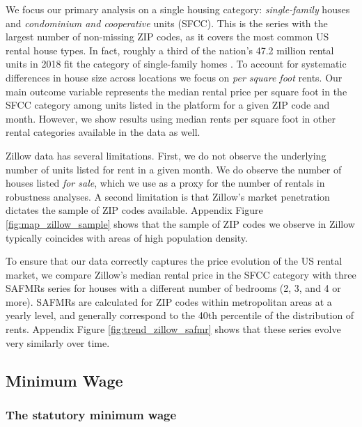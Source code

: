 We focus our primary analysis on a single housing category:
\textit{single-family} houses and \textit{condominium and cooperative} units (SFCC).
This is the series with the largest number of non-missing ZIP codes, as it 
covers the most common US rental house types.
In fact, roughly a third of the nation's 47.2 million rental units in 2018 fit 
the category of single-family homes \parencite{Fernald2020}.
To account for systematic differences in house size across locations we focus 
on \textit{per square foot} rents.
Our main outcome variable represents the median rental price per square foot in 
the SFCC category among units listed in the platform for a given ZIP code and 
month.
However, we show results using median rents per square foot in other rental 
categories available in the data as well.

Zillow data has several limitations.
First, we do not observe the underlying number of units listed for rent in a 
given month.
We do observe the number of houses listed \textit{for sale}, which we use as a
proxy for the number of rentals in robustness analyses.
A second limitation is that Zillow's market penetration dictates the sample of 
ZIP codes available.
Appendix Figure \ref{fig:map_zillow_sample} shows that the sample of ZIP codes
we observe in Zillow typically coincides with areas of high population density.

To ensure that our data correctly captures the price evolution of the US rental 
market, we compare 
Zillow's median rental price in the SFCC category with 
three SAFMRs series for houses with a different number of bedrooms (2, 3, and 
4 or more).
SAFMRs are calculated for ZIP codes within metropolitan areas at a yearly level, 
and generally correspond to the 40th percentile of the distribution of rents.
Appendix Figure \ref{fig:trend_zillow_safmr} shows that these series evolve
very similarly over time.

\subsection{Minimum Wage}\label{sec:mw_construction}

\subsubsection{The statutory minimum wage}

